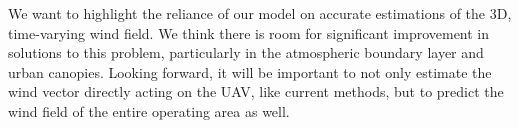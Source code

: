 We want to highlight the reliance of our model on accurate estimations of the 3D, time-varying wind field. We think there is room for significant improvement in solutions to this problem, particularly in the atmospheric boundary layer and urban canopies. Looking forward, it will be important to not only estimate the wind vector directly acting on the UAV, like current methods, but to predict the wind field of the entire operating area as well.
